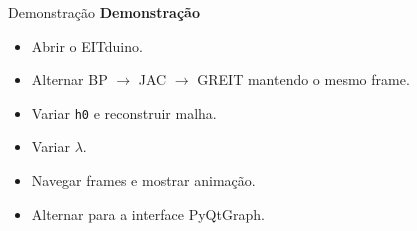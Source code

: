 \documentclass[aspectratio=169]{beamer}
\begin{document}
\begin{frame}{Demonstração}
\centering
\vspace{0.4cm}
{\Huge\bfseries Demonstração}
\vspace{0.5cm}

\begin{tcolorbox}[ufabcbox,title=Roteiro]
\begin{itemize}
  \item Abrir o EITduino.
  \item Alternar BP $\rightarrow$ JAC $\rightarrow$ GREIT mantendo o mesmo frame.
  \item Variar \texttt{h0} e reconstruir malha.
  \item Variar $\lambda$.
  \item Navegar frames e mostrar animação.
  \item Alternar para a interface PyQtGraph.
\end{itemize}
\end{tcolorbox}

\end{frame}
\end{document}
